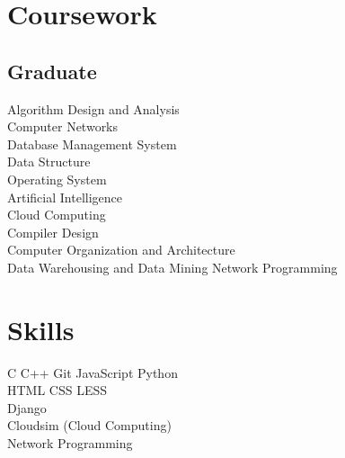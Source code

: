 \documentclass[]{deedy-resume-openfont}
\begin{document}
\begin{minipage}[t]{0.33\textwidth}

\section{Coursework}
\subsection{Graduate}
Algorithm Design and Analysis \\
Computer Networks \\
Database Management System \\
Data Structure \\
Operating System \\
Artificial Intelligence \\
Cloud Computing \\
Compiler Design \\
Computer Organization and Architecture \\
Data Warehousing and Data Mining 
Network Programming\\
\sectionsep


\section{Skills}
\textbullet{}C \textbullet{}   C++ \textbullet{} Git\textbullet{} JavaScript \textbullet{} Python \\ \textbullet{} HTML \textbullet{} CSS \textbullet{} LESS \ \\ 
 \textbullet{} Django \\
\textbullet{}Cloudsim (Cloud Computing) \\ \textbullet{} Network Programming \
\sectionsep

%
%

\end{minipage} 
\hfill
\end{document}
